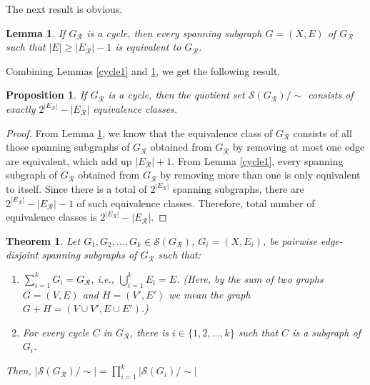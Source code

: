 \documentclass[12pt]{extarticle}
\newtheorem{Theorem}{Theorem}
\newtheorem{Lemma}{Lemma}
\newtheorem{Proposition}{Proposition}
\begin{document}
	The next result is obvious.
	
	\begin{Lemma}\label{cycle2}
		If $G_{\mathcal{R}}$ is a cycle, then every spanning subgraph $G=(X,E)$ of $G_{\mathcal{R}}$ such that $|E|\geq|E_{\mathcal{R}}|-1$  is equivalent to $G_{\mathcal{R}}$.
	\end{Lemma}
	
	Combining Lemmas \ref{cycle1} and \ref{cycle2}, we get the following result.
	\begin{Proposition}\label{cycles}
		If $G_{\mathcal{R}}$ is a cycle, then the quotient set $\mathcal{S}(G_{\mathcal{R}})/\sim$ consists of exactly $2^{|E_{\mathcal{R}}|}-|E_{\mathcal{R}}|$ equivalence classes.
	\end{Proposition}
	
	\begin{proof}
		From Lemma \ref{cycle2}, we know that the equivalence class of $G_{\mathcal{R}}$ consists of all those spanning subgraphs of $G_{\mathcal{R}}$ obtained from $G_{\mathcal{R}}$ by removing at most one edge are equivalent, which add up $|E_{\mathcal{R}}|+1$. From Lemma \ref{cycle1}, every spanning subgraph of $G_{\mathcal{R}}$ obtained from $G_{\mathcal{R}}$ by removing more than one is only equivalent to itself. Since there is a total of $2^{|E_{\mathcal{R}}|}$ spanning subgraphs, there are $2^{|E_{\mathcal{R}}|}-|E_{\mathcal{R}}|-1$ of such equivalence classes. 
		Therefore, total number of equivalence classes is $2^{|E_{\mathcal{R}}|}-|E_{\mathcal{R}}|$. 
	\end{proof}
	
	\begin{Theorem}
		Let \( G_1, G_2, \dots, G_k\in \mathcal{S}(G_{\mathcal{R}})\), $G_i=(X,E_i)$, be pairwise edge-disjoint spanning subgraphs of \(G_{\mathcal{R}} \) such that:
		\begin{enumerate}
			\item  \( \sum_{i=1}^{k} G_i = G_{\mathcal{R}} \), i.e., $\bigcup_{i=1}^k E_i=E$. (Here, by the sum of two graphs $G=(V,E)$ and $H=(V',E')$ we mean the graph $G+H=(V\cup V', E\cup E')$.)
			\item  For every cycle $C$ in $G_{\mathcal{R}}$, there is $i\in\{1,2,\ldots,k\}$ such that $C$ is a subgraph of $G_i$.
		\end{enumerate}
		Then, $|\mathcal{S}(G_{\mathcal{R}})/\sim| = \prod_{i=1}^{k} |\mathcal{S}(G_i)/\sim|$
	\end{Theorem}
	
\end{document}
